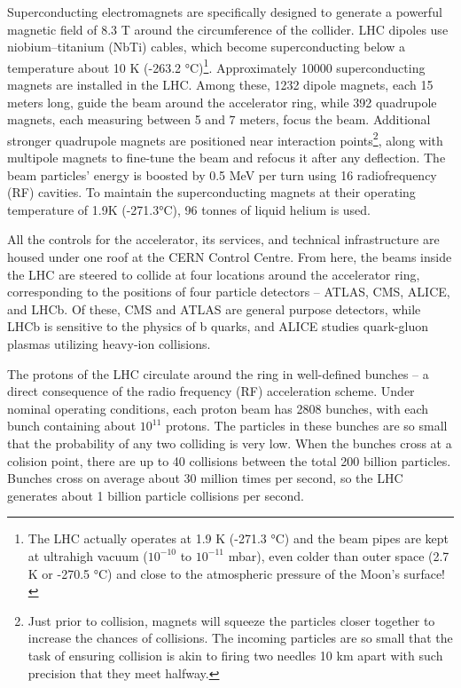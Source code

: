 Superconducting electromagnets are specifically designed to generate a powerful magnetic field of 8.3 T around the circumference of the collider. LHC dipoles use niobium–titanium (NbTi) cables, which become superconducting below a temperature about 10 K (-263.2 °C)\footnote{The LHC actually operates at 1.9 K (-271.3 °C) and the beam pipes are kept at ultrahigh vacuum ($10^{-10}$ to $10^{-11}$ mbar), even colder than outer space (2.7 K or -270.5 °C) and close to the atmospheric pressure of the Moon's surface!}. Approximately 10000 superconducting magnets are installed in the LHC. Among these, 1232 dipole magnets, each 15 meters long, guide the beam around the accelerator ring, while 392 quadrupole magnets, each measuring between 5 and 7 meters, focus the beam. Additional stronger quadrupole magnets are positioned near interaction points\footnote{Just prior to collision, magnets will squeeze the particles closer together to increase the chances of collisions. The incoming particles are so small that the task of ensuring collision is akin to firing two needles 10 km apart with such precision that they meet halfway.}, along with multipole magnets to fine-tune the beam and refocus it after any deflection. The beam particles' energy is boosted by 0.5 MeV per turn using 16 radiofrequency (RF) cavities. To maintain the superconducting magnets at their operating temperature of 1.9K (-271.3°C), 96 tonnes of liquid helium is used. 

All the controls for the accelerator, its services, and technical infrastructure are housed under one roof at the CERN Control Centre. From here, the beams inside the LHC are steered to collide at four locations around the accelerator ring, corresponding to the positions of four particle detectors -- ATLAS, CMS, ALICE, and LHCb. Of these, CMS and ATLAS are general purpose detectors, while LHCb is sensitive to the physics of b quarks, and ALICE studies quark-gluon plasmas utilizing heavy-ion collisions.

The protons of the LHC circulate around the ring in well-defined bunches -- a direct consequence of the radio frequency (RF) acceleration scheme. 
Under nominal operating conditions, each proton beam has 2808 bunches, with each bunch containing about $10^{11}$ protons. 
The particles in these bunches are so small that the probability of any two colliding is very low. When the bunches cross at a colision point, there are up to 40 collisions between the total 200 billion particles. Bunches cross on average about 30 million times per second, so the LHC generates about 1 billion particle collisions per second.

